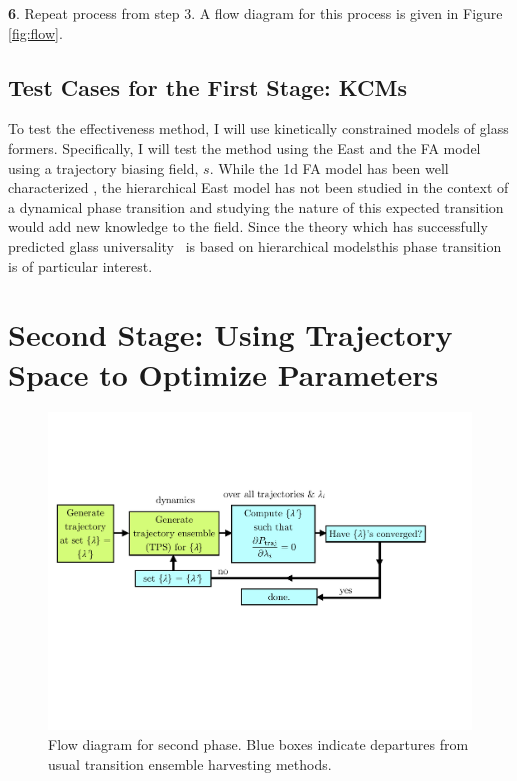 \documentclass[11pt]{article}
\begin{document}
\textbf{6}. Repeat process from step 3. A flow diagram for this process is given in Figure \ref{fig:flow}.

\subsection*{Test Cases for the First Stage: KCMs}
To test the effectiveness method,  I will use kinetically constrained models of glass formers.  Specifically, I will test the method using the East \cite{Ritort_AdvInPhys_2003} and the FA model using a trajectory biasing field, $s$.  While the 1d FA model has been well characterized \cite{Garrahan_JPhysA_2008, Elmatad_PNAS_2010}, the hierarchical East model has not been studied in the context of a dynamical phase transition and studying the nature of this expected transition would add new knowledge to the field.  Since the theory \cite{Garrahan2003} which has successfully predicted glass universality~\cite{Elmatad2009} is based on hierarchical modelsthis phase transition is of particular interest. 

\section*{Second Stage: Using Trajectory Space to Optimize Parameters}
\begin{figure}[b!] %
   \centering
   \includegraphics[width=5in]{flowchart_part2.pdf} 
   \caption{Flow diagram for second phase.  Blue boxes indicate departures from usual transition ensemble harvesting methods.}
   \label{fig:flow2}
\end{figure}
\end{document}
